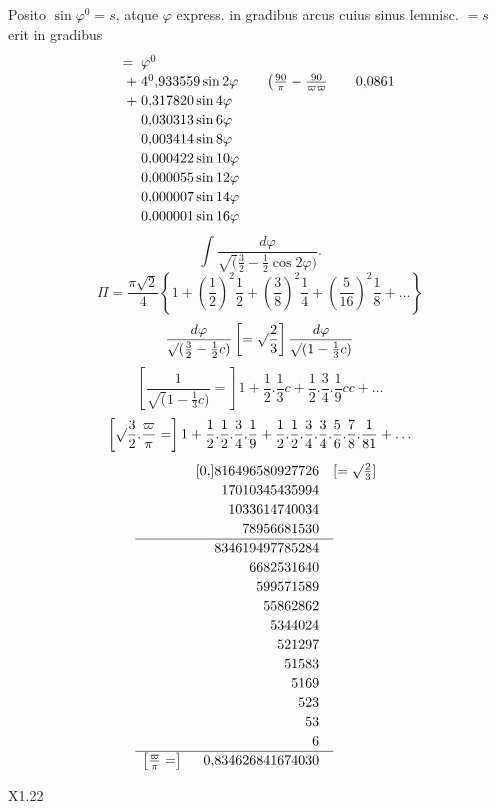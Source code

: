 \noindent Posito \(\sin\varphi^0=s\), atque \(\varphi\) express. in gradibus arcus cuius sinus lemnisc. \(=s\) erit in gradibus
\[\begin{array}{r@{\;}l@{\qquad}l}
={}&\varphi^0&\\
+{}&4^0{,}933559\sin2\varphi&\left(\frac{90}{\pi}-\frac{90}{\varpi\varpi}\qquad0{,}0861\right.\\
+{}&0{,}317820\sin4\varphi&\\
&0{,}030313\sin6\varphi&\\
&0{,}003414\sin8\varphi&\\
&0{,}000422\sin10\varphi&\\
&0{,}000055\sin12\varphi&\\
&0{,}000007\sin14\varphi&\\
&0{,}000001\sin16\varphi&
\end{array}\]
\clearpage
{}\fancyhead{}
\[\int\frac{d\varphi}{\surd(\frac32-\frac12\cos2\varphi)}.\]
\[\Pi=\frac{\pi\surd2}{4}\left\{1+\left(\frac12\right)^2\frac12+\left(\frac38\right)^2\frac14+\left(\frac5{16}\right)^2\frac18+\ldots\right\}\]
\[\frac{d\varphi}{\surd(\frac32-\frac12c)}\left[=\surd\frac23\right]\frac{d\varphi}{\surd(1-\frac13c)}\]
\[\left[\frac1{\surd(1-\frac13c)}=\right]1+\frac12.\frac13c+\frac12.\frac34.\frac19cc+\ldots\]
{\small\[\left[\surd\frac32.\frac{\varpi}{\pi}=\right]1+\frac12.\frac12.\frac34.\frac19+\frac12.\frac12.\frac34.\frac34.\frac56.\frac78.\frac1{81}+\ldots\]}
\[\renewcommand{\arraystretch}{1.15}\begin{array}{r@{}r@{\quad}l}
&[0{,}]816496580927726&[=\surd\frac23]\\
&17010345435994&\\
&1033614740034&\\
&78956681530&\\\cline{1-2}
&834619497785284&\\
&6682531640&\\
&599571589&\\
&55862862&\\
&5344024&\\
&521297&\\
&51583&\\
&5169&\\
&523&\\
&53&\\
&6&\\\cline{1-2}
\left[\frac{\varpi}{\pi}=\right]\quad&0{,}834626841674030&
\end{array}\]
\par\vfill\noindent X1.\hfill22
\clearpage
\endgroup
